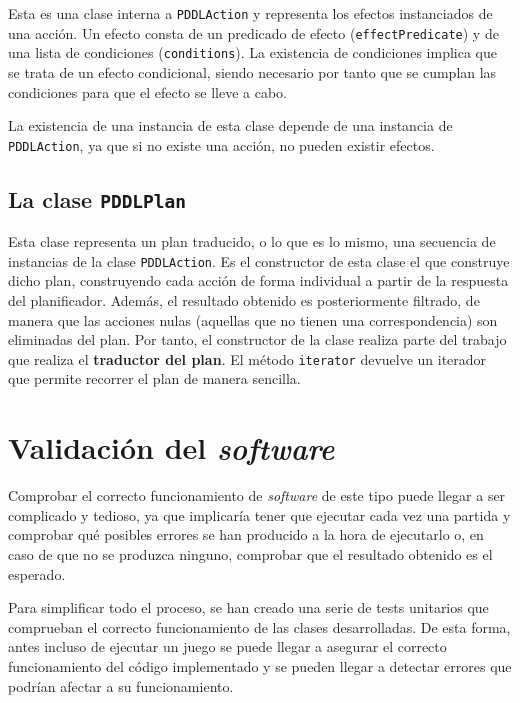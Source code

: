 Esta es una clase interna a \texttt{PDDLAction} y representa los efectos instanciados de una acción.
Un efecto consta de un predicado de efecto (\texttt{effectPredicate}) y de una lista de condiciones
(\texttt{conditions}). La existencia de condiciones implica que se trata de un efecto condicional,
siendo necesario por tanto que se cumplan las condiciones para que el efecto se lleve a cabo.

La existencia de una instancia de esta clase depende de una instancia de \texttt{PDDLAction}, ya
que si no existe una acción, no pueden existir efectos.

\subsection{La clase \texttt{PDDLPlan}}

Esta clase representa un plan traducido, o lo que es lo mismo, una secuencia de instancias de la
clase \texttt{PDDLAction}. Es el constructor de esta clase el que construye dicho plan, construyendo
cada acción de forma individual a partir de la respuesta del planificador. Además, el resultado obtenido
es posteriormente filtrado, de manera que las acciones nulas (aquellas que no tienen una correspondencia)
son eliminadas del plan. Por tanto, el constructor de la clase realiza parte del trabajo que realiza el
\textbf{traductor del plan}. El método \texttt{iterator} devuelve un iterador que permite recorrer el plan
de manera sencilla.

\section{Validación del \textit{software}}

Comprobar el correcto funcionamiento de \textit{software} de este tipo puede llegar a ser
complicado y tedioso, ya que implicaría tener que ejecutar cada vez una partida y comprobar qué
posibles errores se han producido a la hora de ejecutarlo o, en caso de que no se produzca ninguno,
comprobar que el resultado obtenido es el esperado.

Para simplificar todo el proceso, se han creado una serie de tests unitarios que comprueban
el correcto funcionamiento de las clases desarrolladas. De esta forma, antes incluso de
ejecutar un juego se puede llegar a asegurar el correcto funcionamiento del código implementado
y se pueden llegar a detectar errores que podrían afectar a su funcionamiento.

